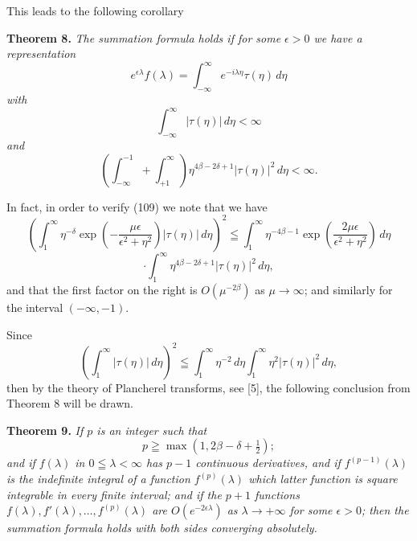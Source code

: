 \documentclass[12pt]{article}
\begin{document}
This leads to the following corollary

\medskip

\noindent\textbf{Theorem 8.} \emph{The summation formula holds if for some \(\epsilon > 0\) we have a representation}
\begin{equation}
e^{\epsilon\lambda} f(\lambda) = \int_{-\infty}^{\infty} e^{-i\lambda\eta} \tau(\eta) \, d\eta
\tag{110}
\end{equation}
\emph{with}
\begin{equation}
\int_{-\infty}^{\infty} | \tau(\eta) | \, d\eta < \infty
\tag{111}
\end{equation}
\emph{and}
\begin{equation}
\left( \int_{-\infty}^{-1} + \int_{+1}^{\infty} \right) \eta^{4\beta-2\delta+1} | \tau(\eta) |^2 \, d\eta < \infty.
\tag{112}
\end{equation}

In fact, in order to verify (109) we note that we have
\[
\left( \int_1^{\infty} \eta^{-\delta} \exp \left( -\frac{\mu\epsilon}{\epsilon^2 + \eta^2} \right) | \tau(\eta) | \, d\eta \right)^2 \leqq \int_1^{\infty} \eta^{-4\beta-1} \exp \left( \frac{2\mu\epsilon}{\epsilon^2 + \eta^2} \right) \, d\eta
\]
\[
\cdot \int_1^{\infty} \eta^{4\beta-2\delta+1} | \tau(\eta) |^2 \, d\eta,
\]
and that the first factor on the right is \(O(\mu^{-2\beta})\) as \(\mu \to \infty\); and similarly for the interval \((-\infty, -1)\).

Since
\begin{equation}
\left( \int_1^{\infty} | \tau(\eta) | \, d\eta \right)^2 \leqq \int_1^{\infty} \eta^{-2} \, d\eta \int_1^{\infty} \eta^2 | \tau(\eta) |^2 \, d\eta,
\tag{113}
\end{equation}
then by the theory of Plancherel transforms, see [5], the following conclusion from Theorem 8 will be drawn.

\medskip

\noindent\textbf{Theorem 9.} \emph{If \(p\) is an integer such that}
\begin{equation}
p \geqq \max(1, 2\beta - \delta + \tfrac{1}{2});
\tag{114}
\end{equation}
\emph{and if \(f(\lambda)\) in \(0 \leqq \lambda < \infty\) has \(p-1\) continuous derivatives, and if \(f^{(p-1)}(\lambda)\) is the indefinite integral of a function \(f^{(p)}(\lambda)\) which latter function is square integrable in every finite interval; and if the \(p+1\) functions \(f(\lambda), f'(\lambda), \dots, f^{(p)}(\lambda)\) are \(O(e^{-2\epsilon\lambda})\) as \(\lambda \to +\infty\) for some \(\epsilon > 0\); then the summation formula holds with both sides converging absolutely.}
\end{document}
